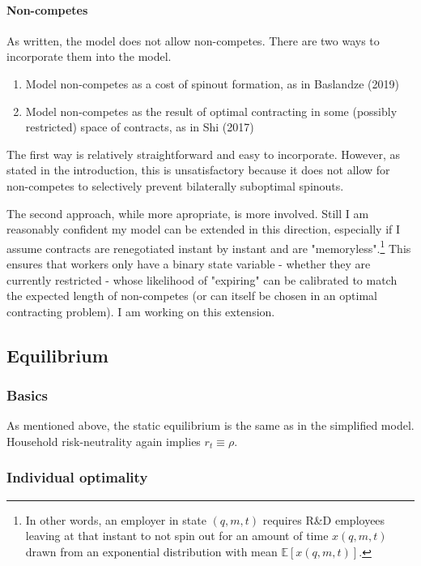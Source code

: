 \documentclass[12pt,english]{article}
\theoremstyle{remark}
\begin{document}
\paragraph{Non-competes}

As written, the model does not allow non-competes. There are two ways to incorporate them into the model.
\begin{enumerate}
	\item Model non-competes as a cost of spinout formation, as in Baslandze (2019)
	\item Model non-competes as the result of optimal contracting in some (possibly restricted) space of contracts, as in Shi (2017)
\end{enumerate}

The first way is relatively straightforward and easy to incorporate. However, as stated in the introduction, this is unsatisfactory because it does not allow for non-competes to selectively prevent bilaterally suboptimal spinouts. 

The second approach, while more apropriate, is more involved. Still I am reasonably confident my model can be extended in this direction, especially if I assume contracts are renegotiated instant by instant and are "memoryless".\footnote{In other words, an employer in state $(q,m,t)$ requires R\&D employees leaving at that instant to not spin out for an amount of time $x(q,m,t)$ drawn from an exponential distribution with mean $\mathbb{E}[x(q,m,t)]$.} This ensures that workers only have a binary state variable - whether they are currently restricted - whose likelihood of "expiring" can be calibrated to match the expected length of non-competes (or can itself be chosen in an optimal contracting problem). I am working on this extension.


\subsection{Equilibrium}

\subsubsection{Basics}

As mentioned above, the static equilibrium is the same as in the simplified model. Household risk-neutrality again implies $r_t \equiv \rho$. 

\subsubsection{Individual optimality}
\end{document}

